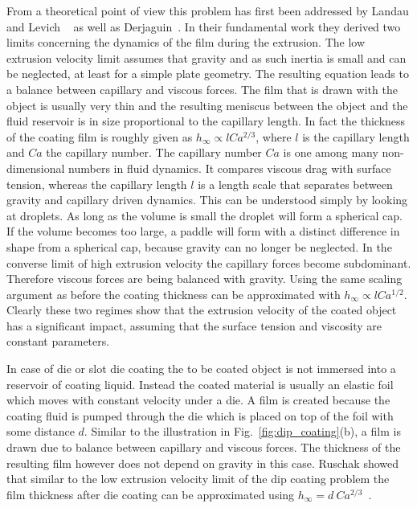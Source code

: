 From a theoretical point of view this problem has first been addressed by Landau and Levich ~\cite{landauDraggingLiquidMoving1988} as well as Derjaguin~\cite{derjaguinThicknessLiquidFilm1993}.
In their fundamental work they derived two limits concerning the dynamics of the film during the extrusion.
The low extrusion velocity limit assumes that gravity and as such inertia is small and can be neglected, at least for a simple plate geometry.
The resulting equation leads to a balance between capillary and viscous forces. 
The film that is drawn with the object is usually very thin and the resulting meniscus between the object and the fluid reservoir is in size proportional to the capillary length.
In fact the thickness of the coating film is roughly given as $h_{\infty} \propto l Ca^{2/3}$, where $l$ is the capillary length and $Ca$ the capillary number.
The capillary number $Ca$ is one among many non-dimensional numbers in fluid dynamics.
It compares viscous drag with surface tension, whereas the capillary length $l$ is a length scale that separates between gravity and capillary driven dynamics.
This can be understood simply by looking at droplets. 
As long as the volume is small the droplet will form a spherical cap.
If the volume becomes too large, a paddle will form with a distinct difference in shape from a spherical cap, because gravity can no longer be neglected.
In the converse limit of high extrusion velocity the capillary forces become subdominant.
Therefore viscous forces are being balanced with gravity. 
Using the same scaling argument as before the coating thickness can be approximated with $h_{\infty} \propto l Ca^{1/2}$.
Clearly these two regimes show that the extrusion velocity of the coated object has a significant impact, assuming that the surface tension and viscosity are constant parameters.

In case of die or slot die coating the to be coated object is not immersed into a reservoir of coating liquid.
Instead the coated material is usually an elastic foil which moves with constant velocity under a die.
A film is created because the coating fluid is pumped through the die which is placed on top of the foil with some distance $d$.
Similar to the illustration in Fig.~\ref{fig:dip_coating}(b), a film is drawn due to balance between capillary and viscous forces.
The thickness of the resulting film however does not depend on gravity in this case.
Ruschak showed that similar to the low extrusion velocity limit of the dip coating problem the film thickness after die coating can be approximated using $h_{\infty} = d~Ca^{2/3}$~\cite{ruschakLimitingFlowPremetered1976}.

